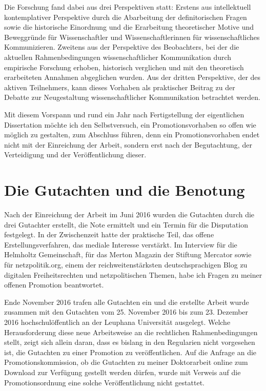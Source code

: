 Die Forschung fand dabei aus drei Perspektiven statt: Erstens aus intellektuell kontemplativer Perspektive durch die Abarbeitung der definitorischen Fragen sowie die historische Einordnung und die Erarbeitung theoretischer Motive und Beweggründe für Wissenschaftler und Wissenschaftlerinnen für wissenschaftliches Kommunizieren. Zweitens aus der Perspektive des Beobachters, bei der die aktuellen Rahmenbedingungen wissenschaftlicher Kommunikation durch empirische Forschung erhoben, historisch verglichen und mit den theoretisch erarbeiteten Annahmen abgeglichen wurden. Aus der dritten Perspektive, der des aktiven Teilnehmers, kann dieses Vorhaben als praktischer Beitrag zu der Debatte zur Neugestaltung wissenschaftlicher Kommunikation betrachtet werden.

Mit diesem Vorspann und rund ein Jahr nach Fertigstellung der eigentlichen Dissertation möchte ich den Selbstversuch, ein Promotionsvorhaben so offen wie möglich zu gestalten, zum Abschluss führen, denn ein Promotionsvorhaben endet nicht mit der Einreichung der Arbeit, sondern erst nach der Begutachtung, der Verteidigung und der Veröffentlichung dieser.

\section{Die Gutachten und die Benotung}

Nach der Einreichung der Arbeit im Juni 2016 wurden die Gutachten durch die drei Gutachter erstellt, die Note ermittelt und ein Termin für die Disputation festgelegt. In der Zwischenzeit hatte der praktische Teil, das offene Erstellungsverfahren, das mediale Interesse verstärkt. Im Interview für die Helmholtz Gemeinschaft, für das Merton Magazin der Stiftung Mercator sowie für netzpolitik.org, einem der reichweitenstärksten deutschsprachigen Blog zu digitalen Freiheitsrechten und netzpolitischen Themen, habe ich Fragen zu meiner offenen Promotion beantwortet.

Ende November 2016 trafen alle Gutachten ein und die erstellte Arbeit wurde zusammen mit den Gutachten vom 25. November 2016 bis zum 23. Dezember 2016 hochschulöffentlich an der Leuphana Universität ausgelegt. Welche Herausforderung diese neue Arbeitsweise an die rechtlichen Rahmenbedingungen stellt, zeigt sich allein daran, dass es bislang in den Regularien nicht vorgesehen ist, die Gutachten zu einer Promotion zu veröffentlichen. Auf die Anfrage an die Promotionskommission, ob die Gutachten zu meiner Doktorarbeit online zum Download zur Verfügung gestellt werden dürfen, wurde mit Verweis auf die Promotionsordnung  eine solche Veröffentlichung nicht gestattet.

